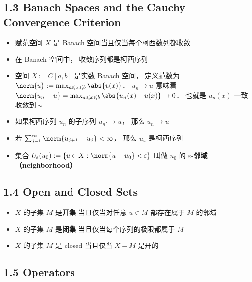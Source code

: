 \subsection{1.3 Banach Spaces and the Cauchy Convergence Criterion}
\begin{itemize}
\item 赋范空间 $X$ 是 Banach 空间当且仅当每个柯西数列都收敛

\item 在 Banach 空间中， 收敛序列都是柯西序列

\item 空间 $X := C[a, b]$ 是实数 Banach 空间， 定义范数为 $\norm{u} := \max_{a \leqslant x \leqslant b} \abs{u(x)}$． $u_n \to u$ 意味着 $\norm{u_n - u} = \max_{a \leqslant x \leqslant b}  \abs{u_n(x) - u(x)} \to 0$． 也就是 $u_n(x)$ 一致收敛到 $u$

\item 如果柯西序列 $u_n$ 的子序列 $u_{n'} \to u$， 那么 $u_n \to u$

\item 若 $\sum_{j=1}^\infty \norm{u_{j+1} - u_j} < \infty$， 那么 $u_n$ 是柯西序列

\item 集合 $U_\varepsilon (u_0) := \{u \in X: \norm{u - u_0} < \varepsilon\}$ 叫做 $u_0$ 的 $\varepsilon$-\textbf{邻域 （neighborhood）}
\end{itemize}

\subsection{1.4 Open and Closed Sets}
\begin{itemize}
\item $X$ 的子集 $M$ 是\textbf{开集} 当且仅当对任意 $u \in M$ 都存在属于 $M$ 的邻域

\item $X$ 的子集 $M$ 是\textbf{闭集} 当且仅当每个序列的极限都属于 $M$

\item $X$ 的子集 $M$ 是 closed 当且仅当 $X - M$ 是开的
\end{itemize}

\subsection{1.5 Operators}

